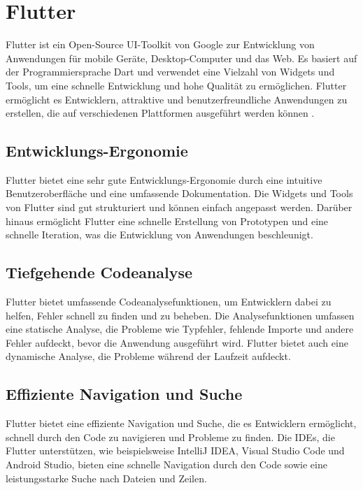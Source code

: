 \section{Flutter}

Flutter ist ein Open-Source UI-Toolkit von Google zur Entwicklung von Anwendungen für mobile Geräte, Desktop-Computer und das Web. Es basiert auf der Programmiersprache Dart und verwendet eine Vielzahl von Widgets und Tools, um eine schnelle Entwicklung und hohe Qualität zu ermöglichen. Flutter ermöglicht es Entwicklern, attraktive und benutzerfreundliche Anwendungen zu erstellen, die auf verschiedenen Plattformen ausgeführt werden können
\cite{aws-flutter}.
\subsection{Entwicklungs-Ergonomie}

Flutter bietet eine sehr gute Entwicklungs-Ergonomie durch eine intuitive Benutzeroberfläche und eine umfassende Dokumentation. Die Widgets und Tools von Flutter sind gut strukturiert und können einfach angepasst werden. Darüber hinaus ermöglicht Flutter eine schnelle Erstellung von Prototypen und eine schnelle Iteration, was die Entwicklung von Anwendungen beschleunigt.

\subsection{Tiefgehende Codeanalyse}

Flutter bietet umfassende Codeanalysefunktionen, um Entwicklern dabei zu helfen, Fehler schnell zu finden und zu beheben. Die Analysefunktionen umfassen eine statische Analyse, die Probleme wie Typfehler, fehlende Importe und andere Fehler aufdeckt, bevor die Anwendung ausgeführt wird. Flutter bietet auch eine dynamische Analyse, die Probleme während der Laufzeit aufdeckt.
\newpage

\subsection{Effiziente Navigation und Suche}

Flutter bietet eine effiziente Navigation und Suche, die es Entwicklern ermöglicht, schnell durch den Code zu navigieren und Probleme zu finden. Die IDEs, die Flutter unterstützen, wie beispielsweise IntelliJ IDEA, Visual Studio Code und Android Studio, bieten eine schnelle Navigation durch den Code sowie eine leistungsstarke Suche nach Dateien und Zeilen.

